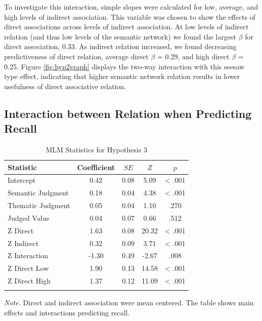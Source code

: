 \documentclass[english,,man]{apa6}
\begin{document}
To investigate this interaction, simple slopes were calculated for low, average, and high levels of indirect association. This variable was chosen to show the effects of direct associations across levels of indirect association. At low levels of indirect relation (and thus low levels of the semantic network) we found the largest \(\beta\) for direct association, 0.33. As indirect relation increased, we found decreasing predictiveness of direct relation, average direct \(\beta\) = 0.29, and high direct \(\beta\) = 0.25. Figure \ref{fig:hyp2graph} displays the two-way interaction with this seesaw type effect, indicating that higher semantic network relation results in lower usefulness of direct associative relation.

\hypertarget{interaction-between-relation-when-predicting-recall}{%
\subsection{Interaction between Relation when Predicting Recall}\label{interaction-between-relation-when-predicting-recall}}

\begin{table}[tbp]
\begin{center}
\begin{threeparttable}
\caption{\label{tab:hyp3-table}MLM Statistics for Hypothesis 3}
\begin{tabular}{lcccc}
\toprule
Statistic & \multicolumn{1}{c}{Coefficient} & \multicolumn{1}{c}{$SE$} & \multicolumn{1}{c}{$Z$} & \multicolumn{1}{c}{$p$}\\
\midrule
Intercept & 0.42 & 0.08 & 5.09 & < .001\\
Semantic Judgment & 0.18 & 0.04 & 4.38 & < .001\\
Thematic Judgment & 0.05 & 0.04 & 1.10 & .270\\
Judged Value & 0.04 & 0.07 & 0.66 & .512\\
Z Direct & 1.63 & 0.08 & 20.32 & < .001\\
Z Indirect & 0.32 & 0.09 & 3.71 & < .001\\
Z Interaction & -1.30 & 0.49 & -2.67 & .008\\
Z Direct Low & 1.90 & 0.13 & 14.58 & < .001\\
Z Direct High & 1.37 & 0.12 & 11.09 & < .001\\
\bottomrule
\addlinespace
\end{tabular}
\begin{tablenotes}[para]
\normalsize{\textit{Note.} Direct and indirect association  were mean centered. The table shows main effects and interactions predicting recall.}
\end{tablenotes}
\end{threeparttable}
\end{center}
\end{table}
\end{document}
